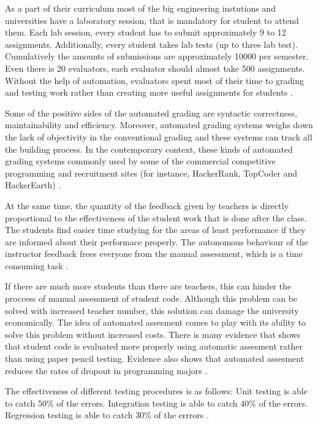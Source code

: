 \documentclass[a4paper, 12pt]{article}
\begin{document}
    As a part of their curriculum most of the big engineering instutions and universities have a laboratory session, that is mandatory
    for student to attend them. Each lab session, every student has to submit approximately 9 to 12 assignments. Additionally, every student takes lab tests (up to three lab test).
    Cumulatively the amounts of submissions are approximately 10000 per semester. Even there is 20 evaluators, each evaluator should almost take 500 assignments.
    Without the help of automation, evaluators spent most of their time to grading and testing work rather than creating more useful assignments for students \cite{Mandal2007}.

    Some of the positive sides of the automated grading are syntactic correctness, maintainability and efficiency.
    Moreover, automated grading systems weighs down the lack of objectivity in the conventional grading and these systems
    can track all the building process. In the contemporary context, these kinds of automated grading systems commonly used by
    some of the commercial competitive programming and recruitment sites (for instance, HackerRank, TopCoder and HackerEarth) \cite{RestrepoCalle2018}.

    At the same time, the quantity of the feedback given by teachers is directly proportional to the effectiveness of the student work that is done
    after the class. The students find easier time studying for the areas of least performance if they are informed about their
    performace properly. The autonomous behaviour of the instructor feedback frees everyone from the manual assessment,
    which is a time consuming task \cite{RestrepoCalle2018-2}.

    If there are much more students than there are teachers, this can hinder the proccess of manual assessment of student code.
    Although this problem can be solved with increased teacher number, this solution can damage the university economically.
    The idea of automated assesment comes to play with its ability to solve this problem without increased costs.
    There is many evidence that shows that student code is evaluated more properly using automatic assesment rather than using paper pencil testing.
    Evidence also shows that automated assesment reduces the rates of dropout in programming majors \cite{Gordillo2019}.

    The effectiveness of different testing procedures is as follows:
    Unit testing is able to catch 50\% of the errors.
    Integration testing is able to catch 40\% of the errors.
    Regression testing is able to catch 30\% of the errrors \cite{Fenton2018}.
\end{document}
